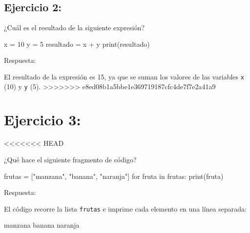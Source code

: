 \documentclass[
  a4paper,
  onepage,
  openany]{scrreprt}
\newenvironment{Shaded}{\begin{snugshade}}{\end{snugshade}}
\newcommand{\BuiltInTok}[1]{\textcolor[rgb]{0.00,0.23,0.31}{#1}}
\newcommand{\ControlFlowTok}[1]{\textcolor[rgb]{0.00,0.23,0.31}{#1}}
\newcommand{\DecValTok}[1]{\textcolor[rgb]{0.68,0.00,0.00}{#1}}
\newcommand{\KeywordTok}[1]{\textcolor[rgb]{0.00,0.23,0.31}{#1}}
\newcommand{\NormalTok}[1]{\textcolor[rgb]{0.00,0.23,0.31}{#1}}
\newcommand{\OperatorTok}[1]{\textcolor[rgb]{0.37,0.37,0.37}{#1}}
\newcommand{\StringTok}[1]{\textcolor[rgb]{0.13,0.47,0.30}{#1}}
\begin{document}
\hypertarget{ejercicio-2-1}{%
\section{Ejercicio 2:}\label{ejercicio-2-1}}

¿Cuál es el resultado de la siguiente expresión?

\begin{Shaded}
\begin{Highlighting}[]
\NormalTok{x }\OperatorTok{=} \DecValTok{10}
\NormalTok{y }\OperatorTok{=} \DecValTok{5}
\NormalTok{resultado }\OperatorTok{=}\NormalTok{ x }\OperatorTok{+}\NormalTok{ y}
\BuiltInTok{print}\NormalTok{(resultado)}
\end{Highlighting}
\end{Shaded}

Respuesta:

El resultado de la expresión es 15, ya que se suman los valores de las
variables \texttt{x} (10) y \texttt{y} (5).
\textgreater\textgreater\textgreater\textgreater\textgreater\textgreater\textgreater{}
e8ed08b1a5bbe1e369719187cfc4de7f7e2a41a9

\hypertarget{ejercicio-3}{%
\chapter{Ejercicio 3:}\label{ejercicio-3}}

\textless\textless\textless\textless\textless\textless\textless{} HEAD

¿Qué hace el siguiente fragmento de código?

\begin{Shaded}
\begin{Highlighting}[]
\NormalTok{frutas }\OperatorTok{=}\NormalTok{ [}\StringTok{"manzana"}\NormalTok{, }\StringTok{"banana"}\NormalTok{, }\StringTok{"naranja"}\NormalTok{]}
\ControlFlowTok{for}\NormalTok{ fruta }\KeywordTok{in}\NormalTok{ frutas:}
    \BuiltInTok{print}\NormalTok{(fruta)}
\end{Highlighting}
\end{Shaded}

Respuesta:

El código recorre la lista \texttt{frutas} e imprime cada elemento en
una línea separada:

\begin{Shaded}
\begin{Highlighting}[]
\NormalTok{manzana}
\NormalTok{banana}
\NormalTok{naranja}
\end{Highlighting}
\end{Shaded}
\end{document}
